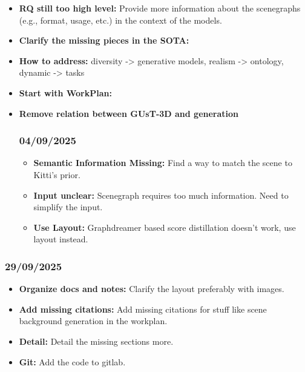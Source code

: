 \documentclass{article}
\begin{document}
\begin{itemize}
    \item \textbf{RQ still too high level:} Provide more information about the scenegraphs (e.g., format, usage, etc.) in the context of the models.
    
    \item \textbf{Clarify the missing pieces in the SOTA:} 

    \item \textbf{How to address:} diversity -> generative models, realism -> ontology, dynamic -> tasks
    
    \item \textbf{Start with WorkPlan:}     
    
    \item \textbf{Remove relation between GUsT-3D and generation}
    
\subsubsection{04/09/2025}    

\begin{itemize}
    \item \textbf{Semantic Information Missing:} Find a way to match the scene to Kitti's prior.
    
    \item \textbf{Input unclear:} Scenegraph requires too much information. Need to simplify the input.

    \item \textbf{Use Layout:} Graphdreamer based score distillation doesn't work, use layout instead.
\end{itemize}
\end{itemize}

\subsubsection{29/09/2025}    

\begin{itemize}
    \item \textbf{Organize docs and notes:} Clarify the layout preferably with images.
    
    \item \textbf{Add missing citations:} Add missing citations for stuff like scene background generation in the workplan.

    \item \textbf{Detail:} Detail the missing sections more.

    \item \textbf{Git:} Add the code to gitlab.
\end{itemize}
\end{document}
